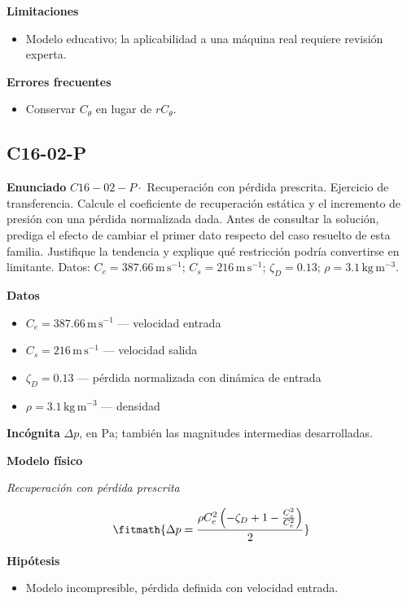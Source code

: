 \documentclass[10pt,openany]{book}
\begin{document}
\noindent\textbf{Limitaciones}
\begin{itemize}
\item Modelo educativo; la aplicabilidad a una máquina real requiere revisión experta.
\end{itemize}

\noindent\textbf{Errores frecuentes}
\begin{itemize}
\item Conservar $C_\theta$ en lugar de $rC_\theta$.
\end{itemize}
\subsection*{C16-02-P}

\noindent\textbf{Enunciado}
\(C16-02-P \cdot\) Recuperación con pérdida prescrita. Ejercicio de transferencia. Calcule el coeficiente de recuperación estática y el incremento de presión con una pérdida normalizada dada. Antes de consultar la solución, prediga el efecto de cambiar el primer dato respecto del caso resuelto de esta familia. Justifique la tendencia y explique qué restricción podría convertirse en limitante. Datos: \(C_e=387.66\, \mathrm{m}\,\mathrm{s}^{-1}\); \(C_s=216\, \mathrm{m}\,\mathrm{s}^{-1}\); \(\zeta_D=0.13\); \(\rho=3.1\, \mathrm{kg}\,\mathrm{m}^{-3}\).

\noindent\textbf{Datos}
\begin{itemize}
\item $C_e = 387.66\,\mathrm{m}\,\mathrm{s}^{-1}$ — velocidad entrada
\item $C_s = 216\,\mathrm{m}\,\mathrm{s}^{-1}$ — velocidad salida
\item $\zeta_D = 0.13$ — pérdida normalizada con dinámica de entrada
\item $\rho = 3.1\,\mathrm{kg}\,\mathrm{m}^{-3}$ — densidad
\end{itemize}

\noindent\textbf{Incógnita}
$\Delta p$, en $\mathrm{Pa}$; también las magnitudes intermedias desarrolladas.

\noindent\textbf{Modelo físico}

\noindent\textit{Recuperación con pérdida prescrita}

\[
\fitmath{\Delta p=\frac{\rho C_e^{2} \left(- \zeta_D + 1 - \frac{C_s^{2}}{C_e^{2}}\right)}{2}}
\]

\noindent\textbf{Hipótesis}
\begin{itemize}
\item Modelo incompresible, pérdida definida con velocidad entrada.
\end{itemize}
\end{document}
